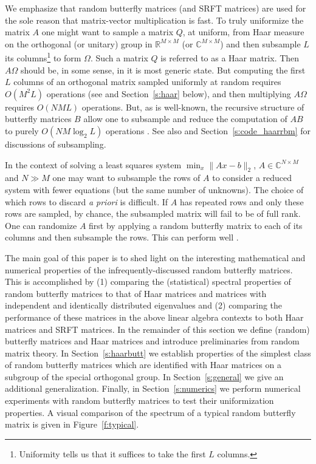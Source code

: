 \documentclass{amsart}
\theoremstyle{definition}
\theoremstyle{remark}
\numberwithin{equation}{section}
\begin{document}
We emphasize that random butterfly matrices (and SRFT matrices) are used for the sole reason that matrix-vector multiplication is fast.  To truly uniformize the matrix $A$ one might want to sample a matrix $Q$, at uniform, from Haar measure on the orthogonal (or unitary) group in $\mathbb R^{M \times M}$ (or $\mathbb C^{M \times M}$) and then subsample $L$ its columns\footnote{Uniformity tells us that it suffices to take the first $L$ columns.} to form $\Omega$. Such a matrix $Q$ is referred to as a Haar matrix. Then $A \Omega$ should be, in some sense, in it is most generic state.  But computing the first $L$ columns of an orthogonal matrix sampled uniformly at random requires $O(M^2 L)$ operations (see \cite{Stewart1980} and Section~\ref{s:haar} below), and then multiplying $A\Omega$ requires $O(NML)$ operations.  But, as is well-known, the recursive structure of butterfly matrices $B$ allow one to subsample and reduce the computation of $AB$ to purely $O(NM \log_2 L)$ operations \cite{Halko2011}.  See also \cite{Boutsidis2013,Tropp2011} and Section~\ref{s:code_haarrbm} for discussions of subsampling.    

In the context of solving a least squares system $\min_x \|Ax - b\|_2$, $A \in \mathbb C^{N \times M}$ and $N \gg M$ one may want to subsample the rows of $A$ to consider a reduced system with fewer equations (but the same number of unknowns).  The choice of which rows to discard \emph{a priori} is difficult.  If $A$ has repeated rows and only these rows are sampled, by chance, the subsampled matrix will fail to be of full rank.  One can randomize $A$ first by applying a random butterfly matrix to each of its columns and then subsample the rows.  This can perform well \cite{Avron2010}.

The main goal of this paper is to shed light on the interesting mathematical and numerical properties of the infrequently-discussed random butterfly matrices.  This is accomplished by (1) comparing the (statistical) spectral properties of random butterfly matrices to that of Haar matrices and matrices with independent and identically distributed eigenvalues and (2) comparing the performance of these matrices in the above linear algebra contexts to both Haar matrices and SRFT matrices.  In the remainder of this section we define (random) butterfly matrices and Haar matrices and introduce preliminaries from random matrix theory.  In Section~\ref{s:haarbutt} we establish properties of the simplest class of random butterfly matrices which are identified with Haar matrices on a subgroup of the special orthogonal group. In Section~\ref{s:general} we give an additional generalization.  Finally, in Section~\ref{s:numerics} we perform numerical experiments with random butterfly matrices to test their uniformization properties.  A visual comparison of the spectrum of a typical random butterfly matrix is given in Figure~\ref{f:typical}.
\end{document}
